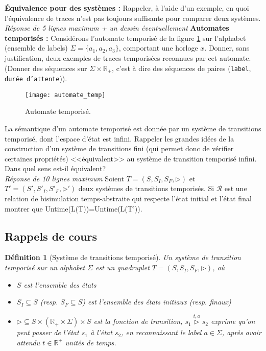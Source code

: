 \documentclass[a4paper]{article}
\newtheorem{definition}{Définition}
\begin{document}
\begin{questions}
\question \textbf{Équivalence pour des systèmes : } Rappeler, à l'aide d'un exemple, en quoi l'équivalence de traces n'est
	pas toujours suffisante pour comparer deux systèmes.\\
	\emph{Réponse de 5 lignes maximum + un dessin éventuellement}
\question \textbf{Automates temporisés : } Considérons l'automate temporisé de la figure \ref{automateT} sur l'alphabet (ensemble de labels)
	$\Sigma=\{a_1,a_2,a_3\}$, comportant une horloge $x$. Donner, sans justification,  deux exemples de traces temporisées reconnues par cet
	automate. (Donner des séquences sur $\Sigma \times \mathbb{R}_+$, c'est à dire des séquences de paires (\texttt{label}, 
	\texttt{durée d'attente})).
	\begin{figure}[!h]
		\begin{center}
		\texttt{[image: automate\_temp]}
		\end{center}
		\caption{Automate temporisé.}
		\label{automateT}
	\end{figure}
\question La sémantique d'un automate temporisé est donnée par un système de transitions temporisé, dont l'espace d'état est infini.
	Rappeler les grandes idées de la construction d'un système de transitions fini (qui permet donc de vérifier certaines propriétés)
	<<équivalent>> au système de transition temporisé infini. Dans quel sens est-il équivalent?\\
	\emph{Réponse de 10 lignes maximum }
\question Soient $T=(S,S_I,S_F,\rhd )$ et $T'=(S',S'_I,S'_F,\rhd')$ deux systèmes de transitions temporisés. Si $\mathcal{R}$ est une
	relation de bisimulation temps-abstraite qui respecte l'état initial et l'état final montrer que Untime(L(T))=Untime(L(T')).
\end{questions}

\subsection*{Rappels de cours}
\begin{definition}[Système de transitions temporisé]
Un système de transition temporisé sur un alphabet $\Sigma$ est un quadruplet
$T=(S,S_I,S_F,\rhd)$, où
\begin{itemize}
\item $S$ est l'ensemble des états
\item $S_I \subseteq S$ (resp. $S_F\subseteq S$) est l'ensemble des états initiaux (resp. finaux)
\item $\rhd \subseteq S \times (\mathbb{R}_+ \times \Sigma) \times S$
  est la fonction de transition, $s_1 \overset{t,a}{\rhd}s_2$ exprime
  qu'on peut passer de l'état $s_1$ à l'état $s_2$, en reconnaissant
  le label $a\in \Sigma$, après avoir attendu $t\in \mathbb{R}^+$
  unités de temps.
\end{itemize} 
\end{definition}
\end{document}
